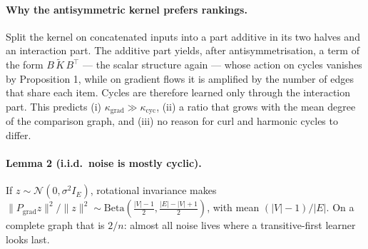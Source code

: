 \paragraph{Why the antisymmetric kernel prefers rankings.} Split the kernel on
concatenated inputs into a part additive in its two halves and an interaction
part. The additive part yields, after antisymmetrisation, a term of the form
$B\,\tilde K\,B^\top$ --- the scalar structure again --- whose action on cycles
vanishes by Proposition 1, while on gradient flows it is amplified by the
number of edges that share each item. Cycles are therefore learned only
through the interaction part. This predicts (i) $\kappa_{\text{grad}} \gg
\kappa_{\text{cyc}}$, (ii) a ratio that grows with the mean degree of the
comparison graph, and (iii) no reason for curl and harmonic cycles to differ.

\paragraph{Lemma 2 (i.i.d.\ noise is mostly cyclic).} If $z \sim
\mathcal{N}(0,\sigma^2 I_E)$, rotational invariance makes $\|P_{\text{grad}}
z\|^2/\|z\|^2 \sim \text{Beta}(\tfrac{|V|-1}{2}, \tfrac{|E|-|V|+1}{2})$, with
mean $(|V|-1)/|E|$. On a complete graph that is $2/n$: almost all noise lives
where a transitive-first learner looks last.
